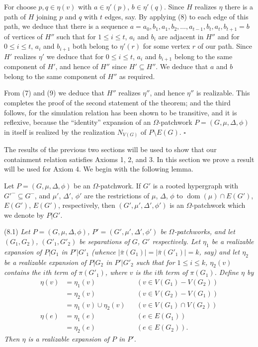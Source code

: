 For choose $p, q \in \eta(v)$ with $a \in \eta'(p)$, $b \in \eta'(q)$. Since $H$ realizes $\eta$ there is a path of $H$ joining $p$ and $q$ with $t$ edges, say. By applying (8) to each edge of this path, we deduce that there is a sequence $a = a_0, b_1, a_1, b_2, \dots, a_{t-1}, b_t, a_t, b_{t+1} = b$ of vertices of $H''$ such that for $1 \le i \le t$, $a_i$ and $b_i$ are adjacent in $H''$ and for $0 \le i \le t$, $a_i$ and $b_{i+1}$ both belong to $\eta'(r)$ for some vertex $r$ of our path. Since $H'$ realizes $\eta'$ we deduce that for $0 \le i \le t$, $a_i$ and $b_{i+1}$ belong to the same component of $H'$, and hence of $H''$ since $H' \subseteq H''$. We deduce that $a$ and $b$ belong to the same component of $H''$ as required.

From (7) and (9) we deduce that $H''$ realizes $\eta''$, and hence $\eta''$ is realizable. This completes the proof of the second statement of the theorem; and the third follows, for the simulation relation has been shown to be transitive, and it is reflexive, because the ``identity'' expansion of an $\Omega$-patchwork $P = (G, \mu, \Delta, \phi)$ in itself is realized by the realization $N_{V(G)}$ of $P \setminus E(G)$. $\square$


The results of the previous two sections will be used to show that our containment relation satisfies Axioms 1, 2, and 3. In this section we prove a result will be used for Axiom 4. We begin with the following lemma.

Let $P = (G, \mu, \Delta, \phi)$ be an $\Omega$-patchwork. If $G'$ is a rooted hypergraph with $G'^- \subseteq G^-$, and $\mu'$, $\Delta'$, $\phi'$ are the restrictions of $\mu$, $\Delta$, $\phi$ to $\operatorname{dom}(\mu) \cap E(G')$, $E(G')$, $E(G')$, respectively, then $(G', \mu', \Delta', \phi')$ is an $\Omega$-patchwork which we denote by $P | G'$.

\stmt
(8.1) \textit{Let $P = (G, \mu, \Delta, \phi)$, $P' = (G', \mu', \Delta', \phi')$ be $\Omega$-patchworks, and let $(G_1, G_2)$, $(G'_1, G'_2)$ be separations of $G$, $G'$ respectively. Let $\eta_1$ be a realizable expansion of $P | G_1$ in $P' | G'_1$ (whence $|\bar{\pi}(G_1)| = |\bar{\pi}(G'_1)| = k$, say) and let $\eta_2$ be a realizable expansion of $P | G_2$ in $P' | G'_2$ such that for $1 \le i \le k$, $\eta_2(v)$ contains the $i$th term of $\pi(G'_1)$, where $v$ is the $i$th term of $\pi(G_1)$. Define $\eta$ by}
\begin{align*}
\eta(v) &= \eta_1(v) && (v \in V(G_1) - V(G_2)) \\
&= \eta_2(v) && (v \in V(G_2) - V(G_1)) \\
&= \eta_1(v) \cup \eta_2(v) && (v \in V(G_1) \cap V(G_2)) \\
\eta(e) &= \eta_1(e) && (e \in E(G_1)) \\
&= \eta_2(e) && (e \in E(G_2)).
\end{align*}
\textit{Then $\eta$ is a realizable expansion of $P$ in $P'$.}
